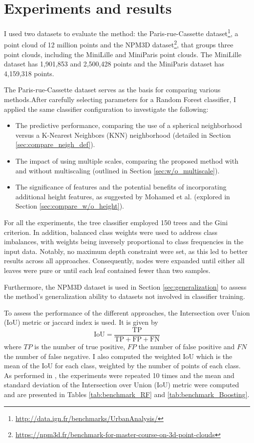 \documentclass{article}
\begin{document}
\section{Experiments and results}
I used two datasets to evaluate the method: the Paris-rue-Cassette dataset\footnote{\url{http://data.ign.fr/benchmarks/UrbanAnalysis/}}, a point cloud of 12 million points and the NPM3D dataset\footnote{\url{https://npm3d.fr/benchmark-for-master-course-on-3d-point-clouds}}, that groups three point clouds, including the MiniLille and MiniParis point clouds. The MiniLille dataset has 1,901,853 and 2,500,428 points and the MiniParis dataset has 4,159,318 points. 

The Paris-rue-Cassette dataset serves as the basis for comparing various methods.After carefully selecting parameters for a Random Forest classifier, I applied the same classifier configuration to investigate the following:
\begin{itemize}
    \item The predictive performance, comparing the use of a spherical neighborhood versus a K-Nearest Neighbors (KNN) neighborhood (detailed in Section \ref{sec:compare_neigh_def}).
    \item The impact of using multiple scales, comparing the proposed method with and without multiscaling (outlined in Section \ref{sec:w/o_multiscale}).
    \item The significance of features and the potential benefits of incorporating additional height features, as suggested by Mohamed et al. \cite{mohamed_improvement_2022} (explored in Section \ref{sec:compare_w/o_height}).
\end{itemize}
For all the experiments, the tree classifier employed 150 trees and the Gini criterion. In addition, balanced class weights were used to address class imbalances, with weights being inversely proportional to class frequencies in the input data. Notably, no maximum depth constraint were set, as this led to better results across all approaches. Consequently, nodes were expanded until either all leaves were pure or until each leaf contained fewer than two samples.
    
Furthermore, the NPM3D dataset is used in Section \ref{sec:generalization} to assess the method's generalization ability to datasets not involved in classifier training.

To assess the performance of the different approaches, the Intersection over Union (IoU) metric or jaccard index is used. It is given by 
$$
\textrm{IoU} = \frac{\textrm{TP}}{\textrm{TP} + \textrm{FP} + \textrm{FN}}
$$
where $TP$ is the number of true positive, $FP$ the number of false positive and $FN$ the number of false negative. I also computed the weighted IoU which is the mean of the IoU for each class, weighted by the number of points of each class. As performed in \cite{thomas_semantic_2018}, the experiments were repeated 10 times and the mean and standard deviation of the Intersection over Union (IoU) metric were computed and are presented in Tables \ref{tab:benchmark_RF} and \ref{tab:benchmark_Boosting}.
\end{document}

